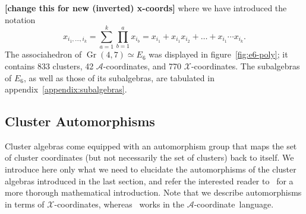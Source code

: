 \documentclass[11pt]{article}
\DeclareMathOperator{\Gr}{Gr}
\def\xcoords{$\mathcal{X}$-coordinates}
\def\acoord{$\mathcal{A}$-coordinate}
\def\acoords{$\mathcal{A}$-coordinates}
\def\draftnote#1{{\bf [#1]}}
\begin{document}
\draftnote{change this for new (inverted) x-coords}
where we have introduced the notation
\begin{equation} \label{eq:compound_x_def}
	x_{i_1,\ldots, i_k} = \sum_{a=1}^k \prod_{b=1}^a x_{i_b} = x_{i_1}+x_{i_1}x_{i_2} + \ldots + x_{i_1}\cdots x_{i_k}.
\end{equation}
The associahedron of $\Gr(4,7) \simeq E_6$ was displayed in figure~\ref{fig:e6-poly}; it contains 833 clusters, 42 \acoords, and 770 \xcoords. The subalgebras of $E_6$, as well as those of its subalgebras, are tabulated in appendix~\ref{appendix:subalgebras}.


\subsection{Cluster Automorphisms}\label{sec:automorphisms}

Cluster algebras come equipped with an automorphism group that maps the set of cluster coordinates (but not necessarily the set of clusters) back to itself. We introduce here only what we need to elucidate the automorphisms of the cluster algebras introduced in the last section, and refer the interested reader to~\cite{Chang:2015} for a more thorough mathematical introduction. Note that we describe automorphisms in terms of \xcoords, whereas~\cite{Chang:2015} works in the \acoord\ language. 
\end{document}
